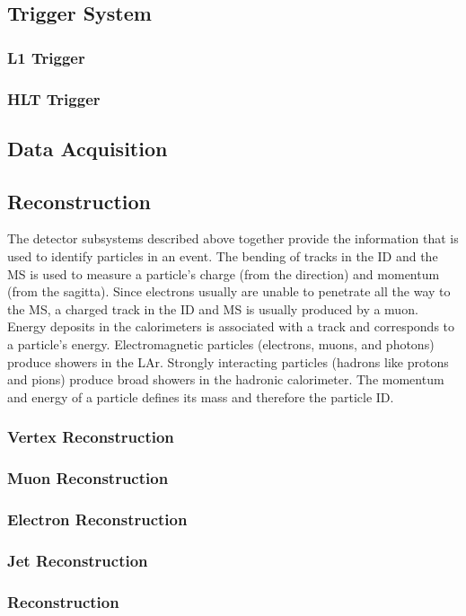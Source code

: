 \subsection{Trigger System}
\subsubsection{L1 Trigger}
\subsubsection{HLT Trigger}
\subsection{Data Acquisition}

\subsection{Reconstruction}
The detector subsystems described above together provide the information that is used to identify particles in an event.
The bending of tracks in the ID and the MS is used to measure a particle's charge (from the direction) and momentum (from the sagitta).
Since electrons usually are unable to penetrate all the way to the MS, a charged track in the ID and MS is usually produced by a muon.
Energy deposits in the calorimeters is associated with a track and corresponds to a particle's energy.
Electromagnetic particles (electrons, muons, and photons) produce showers in the LAr.
Strongly interacting particles (hadrons like protons and pions) produce broad showers in the hadronic calorimeter.
The momentum and energy of a particle defines its mass and therefore the particle ID.

\subsubsection{Vertex Reconstruction}
\subsubsection{Muon Reconstruction}
\subsubsection{Electron Reconstruction}
\subsubsection{Jet Reconstruction}
\subsubsection{\met Reconstruction}








